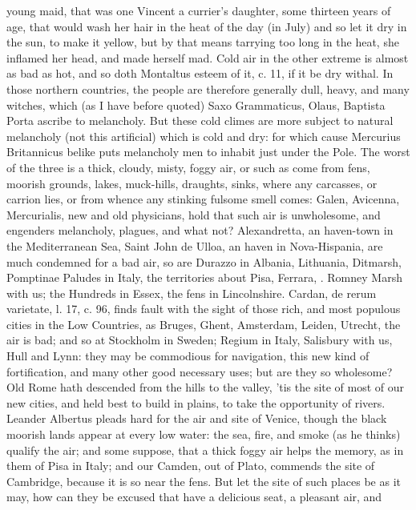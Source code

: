 {young maid, that was one Vincent a currier's daughter, some thirteen
years of age, that would wash her hair in the heat of the day (in July)
and so let it dry in the sun, to make it yellow, but by that
means tarrying too long in the heat, she inflamed her head, and made
herself mad.
Cold air in the other extreme is almost as bad as hot, and so doth
Montaltus esteem of it, c. 11, if it be dry withal. In those northern
countries, the people are therefore generally dull, heavy, and many
witches, which (as I have before quoted) Saxo Grammaticus, Olaus,
Baptista Porta ascribe to melancholy. But these cold climes are more
subject to natural melancholy (not this artificial) which is cold and
dry: for which cause Mercurius Britannicus belike puts melancholy
men to inhabit just under the Pole. The worst of the three is a
thick, cloudy, misty, foggy air, or such as come from fens,
moorish grounds, lakes, muck-hills, draughts, sinks, where any
carcasses, or carrion lies, or from whence any stinking fulsome smell
comes: Galen, Avicenna, Mercurialis, new and old physicians, hold that
such air is unwholesome, and engenders melancholy, plagues, and what
not? Alexandretta, an haven-town in the Mediterranean Sea, Saint
John de Ulloa, an haven in Nova-Hispania, are much condemned for a bad
air, so are Durazzo in Albania, Lithuania, Ditmarsh, Pomptinae Paludes
in Italy, the territories about Pisa, Ferrara, \etc{}. Romney Marsh with
us; the Hundreds in Essex, the fens in Lincolnshire. Cardan, de rerum
varietate, l. 17, c. 96, finds fault with the sight of those rich, and
most populous cities in the Low Countries, as Bruges, Ghent, Amsterdam,
Leiden, Utrecht, \etc{} the air is bad; and so at Stockholm in Sweden;
Regium in Italy, Salisbury with us, Hull and Lynn: they may be
commodious for navigation, this new kind of fortification, and many
other good necessary uses; but are they so wholesome? Old Rome hath
descended from the hills to the valley, 'tis the site of most of our
new cities, and held best to build in plains, to take the opportunity
of rivers. Leander Albertus pleads hard for the air and site of Venice,
though the black moorish lands appear at every low water: the sea,
fire, and smoke (as he thinks) qualify the air; and some suppose,
that a thick foggy air helps the memory, as in them of Pisa in Italy;
and our Camden, out of Plato, commends the site of Cambridge, because
it is so near the fens. But let the site of such places be as it may,
how can they be excused that have a delicious seat, a pleasant air, and
}
